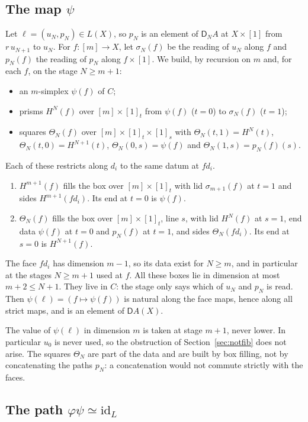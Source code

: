 \documentclass[11pt]{article}
\newcommand{\id}{\mathrm{id}}
\newcommand{\D}{\mathsf{D}}
\theoremstyle{plain}
\theoremstyle{definition}
\theoremstyle{remark}
\begin{document}
\subsection{The map $\psi$}

Let $\ell=(u_N,p_N)\in L(X)$, so $p_N$ is an element of $\D_NA$ at
$X\times[1]$ from $r\,u_{N+1}$ to $u_N$. For $f:[m]\to X$, let $\sigma_N(f)$
be the reading of $u_N$ along $f$ and $p_N(f)$ the reading of $p_N$ along
$f\times[1]$. We build, by recursion on $m$ and, for each $f$, on the
stage $N\ge m+1$:
\begin{itemize}
\item an $m$-simplex $\psi(f)$ of $C$;
\item prisms $H^N(f)$ over $[m]\times[1]_t$ from $\psi(f)$ ($t=0$) to
  $\sigma_N(f)$ ($t=1$);
\item squares $\Theta_N(f)$ over $[m]\times[1]_t\times[1]_s$ with
  $\Theta_N(t,1)=H^N(t)$, $\Theta_N(t,0)=H^{N+1}(t)$,
  $\Theta_N(0,s)=\psi(f)$ and $\Theta_N(1,s)=p_N(f)(s)$.
\end{itemize}
Each of these restricts along $d_i$ to the same datum at $fd_i$.
\begin{enumerate}
\item $H^{m+1}(f)$ fills the box over $[m]\times[1]_t$ with lid
  $\sigma_{m+1}(f)$ at $t=1$ and sides $H^{m+1}(fd_i)$. Its end at $t=0$ is
  $\psi(f)$.
\item $\Theta_N(f)$ fills the box over $[m]\times[1]_t$, line $s$, with lid
  $H^N(f)$ at $s=1$, end data $\psi(f)$ at $t=0$ and $p_N(f)$ at $t=1$, and
  sides $\Theta_N(fd_i)$. Its end at $s=0$ is $H^{N+1}(f)$.
\end{enumerate}
The face $fd_i$ has dimension $m-1$, so its data exist for $N\ge m$, and
in particular at the stages $N\ge m+1$ used at $f$. All these boxes lie in
dimension at most $m+2\le N+1$. They live in $C$: the stage only says which
of $u_N$ and $p_N$ is read. Then $\psi(\ell)=(f\mapsto\psi(f))$ is natural
along the face maps, hence along all strict maps, and is an element of
$\D A(X)$.

The value of $\psi(\ell)$ in dimension $m$ is taken at stage $m+1$, never
lower. In particular $u_0$ is never used, so the obstruction of
Section~\ref{sec:notfib} does not arise. The squares $\Theta_N$ are part of
the data and are built by box filling, not by concatenating the paths
$p_N$: a concatenation would not commute strictly with the faces.

\subsection{The path $\varphi\psi\simeq\id_L$}
\end{document}

